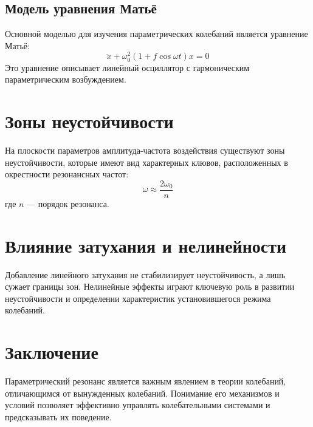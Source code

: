 \documentclass[10pt]{article}
\begin{document}
\subsection*{Модель уравнения Матьё}
Основной моделью для изучения параметрических колебаний является уравнение Матьё:
\begin{equation*}
\ddot{x}+\omega_{0}^{2}(1+f \cos \omega t) x=0
\end{equation*}
Это уравнение описывает линейный осциллятор с гармоническим параметрическим возбуждением.

\section*{Зоны неустойчивости}
На плоскости параметров амплитуда-частота воздействия существуют зоны неустойчивости, которые имеют вид характерных клювов, расположенных в окрестности резонансных частот:
\begin{equation*}
\omega \approx \frac{2 \omega_{0}}{n}
\end{equation*}
где $n$ — порядок резонанса.

\section*{Влияние затухания и нелинейности}
Добавление линейного затухания не стабилизирует неустойчивость, а лишь сужает границы зон. Нелинейные эффекты играют ключевую роль в развитии неустойчивости и определении характеристик установившегося режима колебаний.

\section*{Заключение}
Параметрический резонанс является важным явлением в теории колебаний, отличающимся от вынужденных колебаний. Понимание его механизмов и условий позволяет эффективно управлять колебательными системами и предсказывать их поведение.
\end{document}
